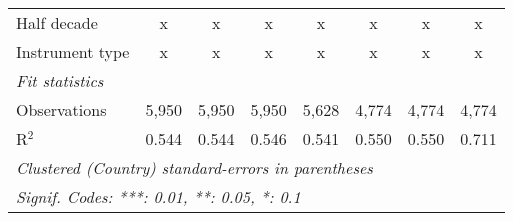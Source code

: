 \begin{table}[htbp]
\begin{tabular}{lccccccc}
      Half decade                                                                               & x       & x       & x             & x             & x             & x             & x\\  
      Instrument type                                                                           & x       & x       & x             & x             & x             & x             & x\\  
      \midrule \emph{Fit statistics}\\
      Observations                                                                              & 5,950   & 5,950   & 5,950         & 5,628         & 4,774         & 4,774         & 4,774\\  
      R$^2$                                                                                     & 0.544   & 0.544   & 0.546         & 0.541         & 0.550         & 0.550         & 0.711\\  
      \midrule
      \multicolumn{8}{l}{\emph{Clustered (Country) standard-errors in parentheses}}\\
      \multicolumn{8}{l}{\emph{Signif. Codes: ***: 0.01, **: 0.05, *: 0.1}}\\
   \end{tabular}
\end{table}


